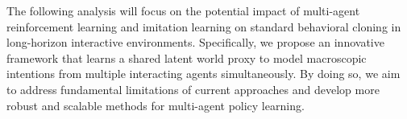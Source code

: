 The following analysis will focus on the potential impact of multi-agent reinforcement learning and imitation learning on standard behavioral cloning in long-horizon interactive environments. Specifically, we propose an innovative framework that learns a shared latent world proxy to model macroscopic intentions from multiple interacting agents simultaneously. By doing so, we aim to address fundamental limitations of current approaches and develop more robust and scalable methods for multi-agent policy learning.
